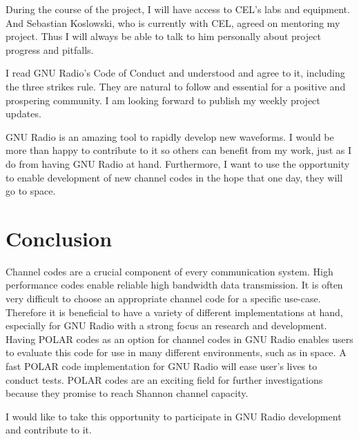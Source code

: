 \documentclass[a4paper,12pt]{scrartcl}
\begin{document}
During the course of the project, I will have access to \ac{CEL}'s labs and equipment.
And Sebastian Koslowski, who is currently with \ac{CEL}, agreed on mentoring my project.
Thus I will always be able to talk to him personally about project progress and pitfalls.

I read GNU Radio's Code of Conduct and understood and agree to it, including the three strikes rule.
They are natural to follow and essential for a positive and prospering community.
I am looking forward to publish my weekly project updates.

GNU Radio is an amazing tool to rapidly develop new waveforms.
I would be more than happy to contribute to it so others can benefit from my work, just as I do from having GNU Radio at hand.
Furthermore, I want to use the opportunity to enable development of new channel codes in the hope that one day, they will go to space.

\section{Conclusion}
Channel codes are a crucial component of every communication system.
High performance codes enable reliable high bandwidth data transmission.
It is often very difficult to choose an appropriate channel code for a specific use-case.
Therefore it is beneficial to have a variety of different implementations at hand, especially for GNU Radio with a strong focus an research and development.
Having POLAR codes as an option for channel codes in GNU Radio enables users to evaluate this code for use in many different environments, such as in space.
A fast POLAR code implementation for GNU Radio will ease user's lives to conduct tests.
POLAR codes are an exciting field for further investigations because they promise to reach Shannon channel capacity.

I would like to take this opportunity to participate in GNU Radio development and contribute to it.


\newpage
\appendix

%  
%  
%  



\end{document}
